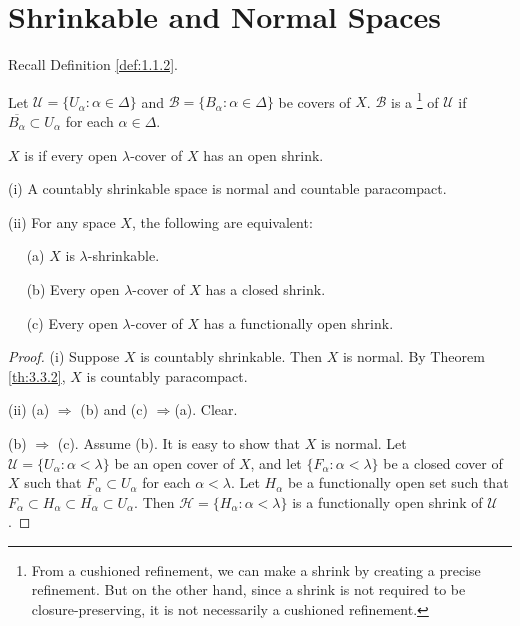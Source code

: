 \documentclass[jisng5i.tex]{subfiles}
\begin{document}
\section{Shrinkable and Normal Spaces} \label{sec:5.2}

Recall Definition \ref{def:1.1.2}.
{
Let $\mathscr{U} = \{U_\alpha: \alpha \in \Delta\}$ and $\mathscr{B} = \{B_\alpha: \alpha \in \Delta\}$ 
be covers of $X$. $\mathscr{B}$ is a 
\footnote{From a cushioned refinement, we 
	can make a shrink by creating a precise refinement. But on the other hand, since a shrink is not
	required to be closure-preserving, it is not necessarily a cushioned refinement.} 
of $\mathscr{U}$ if $\overline{B_\alpha} \subset U_\alpha$ for each $\alpha\in \Delta$.

$X$ is 
if every open $\lambda$-cover of $X$ has an open shrink.
}

{\lemma{\label{lem:5.2.2}}
\textup{(i)} A countably shrinkable space is normal and countable paracompact.

\textup{(ii)} For any space $X$, the following are equivalent:

$\quad$ \textup{(a)} $X$ is $\lambda$-shrinkable.

$\quad$ \textup{(b)} Every open $\lambda$-cover of $X$ has a closed shrink.

$\quad$ \textup{(c)} Every open $\lambda$-cover of $X$ has a functionally open shrink.
}

\begin{proof}
(i) Suppose $X$ is countably shrinkable. Then $X$ is normal. By Theorem \ref{th:3.3.2}, 
$X$ is countably paracompact.

(ii) (a) $\Rightarrow$ (b) and (c) $\Rightarrow $(a). Clear.

(b) $\Rightarrow$ (c).
Assume (b). It is easy to show that $X$ is normal. Let 
$\mathscr{U} = \{U_\alpha: \alpha < \lambda\}$ be an open cover of $X$, and 
let $\{F_\alpha: \alpha < \lambda\}$ be a closed cover of $X$ 
such that $F_\alpha \subset U_\alpha$ for each $\alpha < \lambda$. 
Let $H_\alpha$ be a functionally open set such that 
$F_\alpha \subset H_\alpha \subset \overline{H_\alpha} \subset U_\alpha$. 
Then $\mathscr{H} = \{H_\alpha: \alpha < \lambda\}$ is a functionally open 
shrink of $\mathscr{U}$.
\end{proof}
\end{document}
